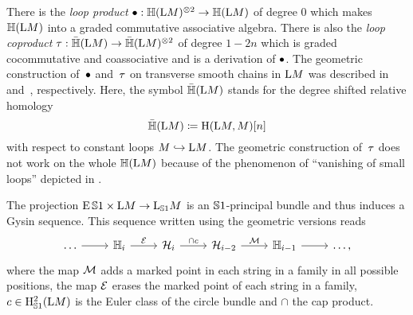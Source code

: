 \documentclass[\MainFolder/Text.tex]{subfiles}
\begin{document}
There is the \emph{loop product} $\bullet: \mathbb{H}(\mathrm{L} M)^{\otimes 2} \rightarrow \mathbb{H}(\mathrm{L} M)$ of degree $0$ which makes $\mathbb{H}(\mathrm{L} M)$ into a graded commutative associative algebra. There is also the \emph{loop coproduct} $\tau: \bar{\mathbb{H}}(\mathrm{L} M) \rightarrow \bar{\mathbb{H}}(\mathrm{L} M)^{\otimes 2}$ of degree $1-2n$ which is graded cocommutative and coassociative and is a derivation of $\bullet$. The geometric construction of~$\bullet$ and~$\tau$ on transverse smooth chains in $\mathrm{L} M$ was described in~\cite{Sullivan1999} and~\cite{Basu2011}, respectively. Here, the symbol $\bar{\mathbb{H}}(\mathrm{L} M)$ stands for the degree shifted relative homology
$$  \bar{\mathbb{H}}(\mathrm{L} M)\coloneqq\mathrm{H}(\mathrm{L} M, M)[n] $$
with respect to constant loops $M \hookrightarrow \mathrm{L} M$. The geometric construction of~$\tau$ does not work on the whole $\mathbb{H}(\mathrm{L} M)$ because of the phenomenon of ``vanishing of small loops'' depicted in \cite[Figure 4, p.\,13]{Cieliebak2007}.

The projection $\operatorname{E}\mathbb{S}{1} \times \mathrm{L} M \rightarrow \mathrm{L}_{\mathbb{S}{1}} M$ is an $\mathbb{S}{1}$-principal bundle and thus induces a Gysin sequence. This sequence written using the geometric versions reads
\begin{equation}\label{Eq:Gysin}
\begin{tikzcd}
\dots\arrow{r}& \GeomH_i \arrow{r}{\Erase} & \GeomStringH_i \arrow{r}{\cap c} & \GeomStringH_{i-2} \arrow{r}{\Mark} & \GeomH_{i-1} \arrow{r} & \dots,
\end{tikzcd}
\end{equation}
where the map $\mathcal{M}$ adds a marked point in each string in a family in all possible positions, the map $\mathcal{E}$ erases the marked point of each string in a family, $c\in \mathrm{H}_{\mathbb{S}{1}}^{2}(\mathrm{L} M)$ is the Euler class of the circle bundle and $\cap$ the cap product.
\end{document}
